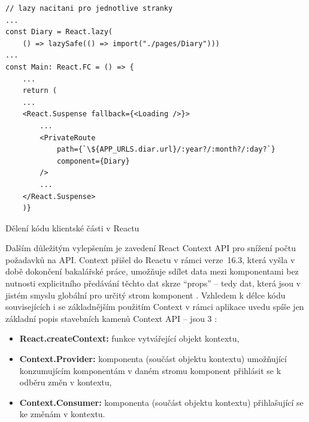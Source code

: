 \begin{listing}[ht]
	\begin{verbatim}
// lazy nacitani pro jednotlive stranky
...
const Diary = React.lazy(
    () => lazySafe(() => import("./pages/Diary")))
...
const Main: React.FC = () => {
    ...
    return (
    ...
    <React.Suspense fallback={<Loading />}>
        ...
        <PrivateRoute
            path={`\${APP_URLS.diar.url}/:year?/:month?/:day?`}
            component={Diary}
        />
        ...
    </React.Suspense>
    )}
	\end{verbatim}
	\caption{Dělení kódu klientské části v Reactu}\label{lst:optimalizace-react}
\end{listing}

Dalším důležitým vylepšením je zavedení React Context API pro snížení počtu požadavků na API. Context přišel do Reactu v rámci verze~16.3, která vyšla v době dokončení bakalářské práce, umožňuje sdílet data mezi komponentami bez nutnosti explicitního předávání těchto dat skrze \enquote{props} -- tedy dat, která jsou v jistém smyslu globální pro určitý strom komponent \cite{react-context}. Vzhledem k délce kódu souvisejících i se základnějším použitím Context v rámci aplikace uvedu spíše jen základní popis stavebních kamenů Context API -- jsou 3 \cite{react-context}:
\begin{itemize}
    \item \textbf{React.createContext:} funkce vytvářející objekt kontextu,
    \item \textbf{Context.Provider:} komponenta (součást objektu kontextu) umožňující konzumujícím komponentám v daném stromu komponent přihlásit se k odběru změn v kontextu,
    \item \textbf{Context.Consumer:} komponenta (součást objektu kontextu) přihlašující se ke změnám v kontextu.
\end{itemize}

